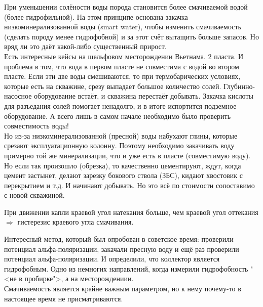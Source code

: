 \documentclass[main.tex]{subfiles}
\begin{document}


При уменьшении солёности воды порода становится более смачиваемой водой (более гидрофильной). На этом принципе основана закачка низкоминерализованной воды (smart water), чтобы изменить смачиваемость (сделать породу менее гидрофобной) и за этот счёт вытащить больше запасов. Но вряд ли это даёт какой-либо существенный прирост.\\

Есть интересные кейсы на шельфовом месторождении Вьетнама. 2 пласта. И проблема в том, что вода в первом пласте не совместима с водой во втором пласте. Если эти две воды смешиваются, то при термобарических условиях, которые есть на скважине, срезу выпадает большое количество солей. Глубинно-насосное оборудование встаёт, и скважина перестаёт добывать. Закачка кислоты для разъедания солей помогает ненадолго, и в итоге испортится подземное оборудование. А всего лишь в самом начале необходимо было проверить совместимость воды!\\

Но из-за низкоминерализованной (пресной) воды набухают глины, которые срезают эксплуатационную колонну. Поэтому необходимо закачивать воду примерно той же минерализации, что и уже есть в пласте (совместимую воду). Но если так произошло (обрезка), то качественно цементируют, ждут, когда цемент застынет, делают зарезку бокового ствола (ЗБС), кидают хвостовик с перекрытием и т.д. И начинают добывать. Но это всё по стоимости сопоставимо с новой скважиной.


При движении капли краевой угол натекания больше, чем краевой угол оттекания $\Rightarrow$ гистерезис краевого угла смачивания.


Интересный метод, который был опробован в советское время: проверили потенциал альфа-поляризации, закачали пресную воду и ещё раз проверили потенциал альфа-поляризации. И определили, что коллектор является гидрофобным. Одно из немногих направлений, когда измерили гидрофобность "<не в пробирке">, а на месторождениии.\\

Смачиваемость является крайне важным параметром, но к нему почему-то в настоящее время не присматриваются.
\end{document}

